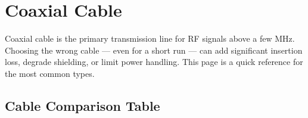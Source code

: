 \section{Coaxial Cable}\label{sec:wiki_coax_cable}



Coaxial cable is the primary transmission line for RF signals above a few MHz. Choosing the wrong cable — even for a short run — can add significant insertion loss, degrade shielding, or limit power handling. This page is a quick reference for the most common types.

      

\subsection{Cable Comparison Table}

      
        
        
        
        
        
        
        
        
        
        
        
      


